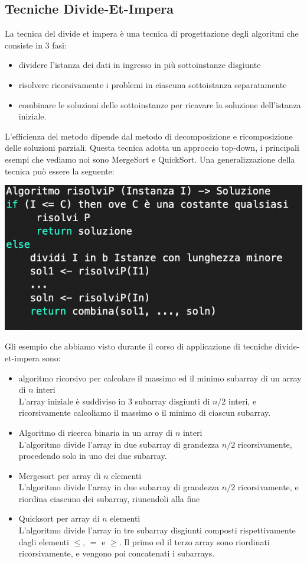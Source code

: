 \documentclass[11pt, oneside]{article}   	%
\begin{document}
\subsection{Tecniche Divide-Et-Impera}
La tecnica del divide et impera è una tecnica di progettazione degli algoritmi che consiste in 3 fasi:
\begin{itemize}
\item dividere l'istanza dei dati in ingresso in più sottoinstanze disgiunte
\item risolvere ricorsivamente i problemi in ciascuna sottoistanza separatamente
\item combinare le soluzioni delle sottoinstanze per ricavare la soluzione dell'istanza iniziale.
\end{itemize}
L'efficienza del metodo dipende dal metodo di decomposizione e ricomposizione delle soluzioni parziali. Questa tecnica adotta un approccio top-down, i principali esempi che vediamo noi sono MergeSort e QuickSort. Una generalizzazione della tecnica può essere la seguente:
\begin{center}
\includegraphics[scale=0.8]{divide}
\end{center}
Gli esempio che abbiamo visto durante il corso di applicazione di tecniche divide-et-impera sono:
\begin{itemize}
\item algoritmo ricorsivo per calcolare il massimo ed il minimo subarray di un array di $n$ interi\\
L'array iniziale è suddiviso in 3 subarray disgiunti di $n/2$ interi, e ricorsivamente calcoliamo il massimo o il minimo di ciascun subarray.
\item Algoritmo di ricerca binaria in un array di $n$ interi\\
L'algoritmo divide l'array in due subarray di grandezza $n/2$ ricorsivamente, procedendo solo in uno dei due subarray.
\item Mergesort per array di $n$ elementi\\
L'algoritmo divide l'array in due subarray di grandezza $n/2$ ricorsivamente, e riordina ciascuno dei subarray, riunendoli alla fine
\item Quicksort per array di $n$ elementi\\
L'algoritmo divide l'array in tre subarray disgiunti composti rispettivamente dagli elementi $\leq$, $=$ e $\geq$. Il primo ed il terzo array sono riordinati ricorsivamente, e vengono poi concatenati i subarrays. 
\end{itemize}
\end{document}
